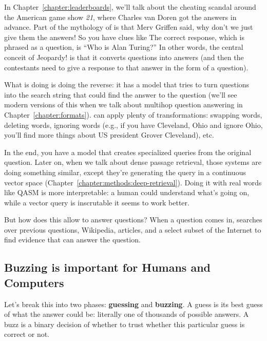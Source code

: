 In Chapter~\ref{chapter:leaderboards}, we'll talk about the cheating scandal
around the American game show \textit{21}, where Charles van Doren got
the answers in advance.
%
Part of the mythology of \jeopardy{} is that Merv Griffen said, why
don’t we just give them the answers!
%
So you have clues like 
%
The correct response, which is phrased as a question, is
``Who is Alan Turing?''
%
In other words, the central conceit of Jeopardy! is that it converts questions
into answers (and then the contestants need to give a response to that answer
in the form of a question).

What  is doing is doing the reverse: it has a model that
tries to turn questions into the search string that could find the
answer to the question (we'll see modern versions of this when we talk about
multihop question answering in Chapter~\ref{chapter:formats}).
%
 can apply plenty of transformations: swapping words,
deleting words, ignoring words (e.g., if you have Cleveland, Ohio and ignore
Ohio, you’ll find more things about US president Grover Cleveland), etc.


In the end, you have a model that creates specialized queries from the
original question.
%
Later on, when we talk about dense passage
retrieval, those systems are doing something similar, except they’re
generating the query in a continuous vector space (Chapter~\ref{chapter:methods:deep-retrieval}).
%
Doing it with real words like QASM is more interpretable: a human could
understand what’s going on, while a vector query is inscrutable it seems to
work better.

But how does this allow \watson{} to answer questions?
%
When a question comes in, \watson{} searches over previous \jeopardy{}
questions, Wikipedia, articles, and a select subset of the Internet to find
evidence that can answer the question.

\subsection{Buzzing is important for Humans and Computers}

Let's break this into two phases: {\bf guessing} and {\bf buzzing}.
%
A guess is its best guess of what the answer could be: literally one of
thousands of possible answers.
%
A buzz is a binary decision of whether to trust whether this particular guess
is correct or not.


